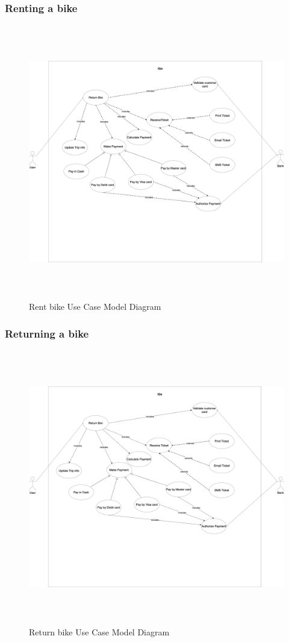 \subsubsection{Renting a bike}
\begin{figure}[H]
  \centering
  \includegraphics[width=17cm, height=12cm]{images/rentBixiUseCase.jpg}
  \caption{Rent bike Use Case Model Diagram}
  \label{fig:Rent bixi Case Model Diagram}
\end{figure}

\subsubsection{Returning a bike}
\begin{figure}[H]
  \centering
  \includegraphics[width=17cm, height=12cm]{images/returnBixiUseCase.jpg}
  \caption{Return bike Use Case Model Diagram}
  \label{fig:Return bixi Case Model Diagram}
\end{figure}


